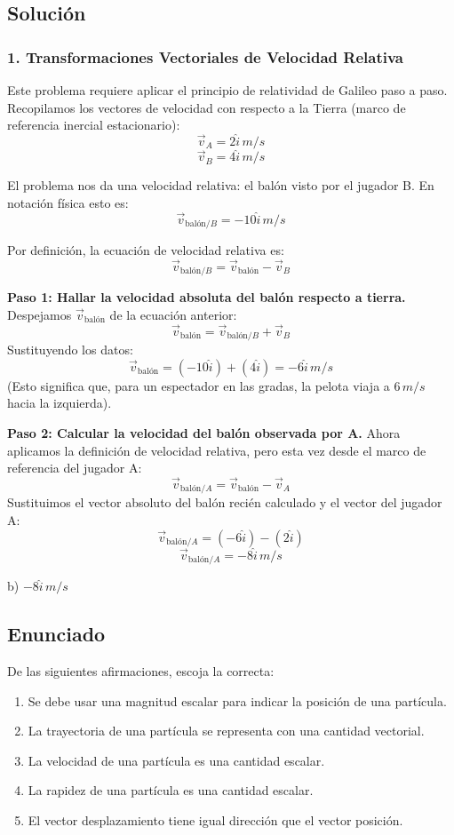 \documentclass[12pt, a4paper]{article}
\begin{document}
\subsection*{Solución}

\subsubsection*{1. Transformaciones Vectoriales de Velocidad Relativa}
Este problema requiere aplicar el principio de relatividad de Galileo paso a paso. Recopilamos los vectores de velocidad con respecto a la Tierra (marco de referencia inercial estacionario):
$$ \vec{v}_A = 2\hat{i} \,\si{m/s} $$
$$ \vec{v}_B = 4\hat{i} \,\si{m/s} $$

El problema nos da una velocidad relativa: el balón visto por el jugador B. En notación física esto es:
$$ \vec{v}_{\text{balón}/B} = -10\hat{i} \,\si{m/s} $$

Por definición, la ecuación de velocidad relativa es:
$$ \vec{v}_{\text{balón}/B} = \vec{v}_{\text{balón}} - \vec{v}_B $$

\textbf{Paso 1: Hallar la velocidad absoluta del balón respecto a tierra.}
Despejamos $\vec{v}_{\text{balón}}$ de la ecuación anterior:
$$ \vec{v}_{\text{balón}} = \vec{v}_{\text{balón}/B} + \vec{v}_B $$
Sustituyendo los datos:
$$ \vec{v}_{\text{balón}} = (-10\hat{i}) + (4\hat{i}) = -6\hat{i} \,\si{m/s} $$
(Esto significa que, para un espectador en las gradas, la pelota viaja a $6\,\si{m/s}$ hacia la izquierda).

\textbf{Paso 2: Calcular la velocidad del balón observada por A.}
Ahora aplicamos la definición de velocidad relativa, pero esta vez desde el marco de referencia del jugador A:
$$ \vec{v}_{\text{balón}/A} = \vec{v}_{\text{balón}} - \vec{v}_A $$
Sustituimos el vector absoluto del balón recién calculado y el vector del jugador A:
$$ \vec{v}_{\text{balón}/A} = (-6\hat{i}) - (2\hat{i}) $$
$$ \vec{v}_{\text{balón}/A} = -8\hat{i} \,\si{m/s} $$

\begin{tcolorbox}[colback=green!5!white, colframe=green!50!black, title=Respuesta Final]
\centering \Large b) $-8\hat{i}\,\si{m/s}$
\end{tcolorbox}

\newpage

\subsection*{Enunciado}
De las siguientes afirmaciones, escoja la correcta:
\begin{enumerate}[label=\alph*)]
    \item Se debe usar una magnitud escalar para indicar la posición de una partícula.
    \item La trayectoria de una partícula se representa con una cantidad vectorial.
    \item La velocidad de una partícula es una cantidad escalar.
    \item La rapidez de una partícula es una cantidad escalar.
    \item El vector desplazamiento tiene igual dirección que el vector posición.
\end{enumerate}
\end{document}
